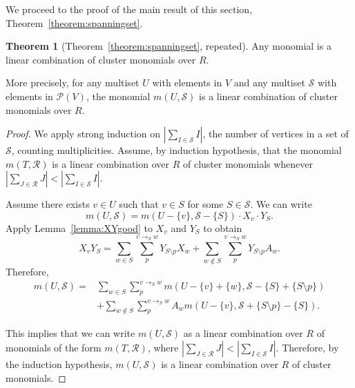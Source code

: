 \documentclass[11pt]{article}
\theoremstyle{definition}
\newtheorem*{theo*}{Theorem}
\numberwithin{equation}{section}
\newcommand{\vertices}{V}
\newcommand{\powerset}[1]{\mathcal{P}(#1)}
\newcommand{\coefficientring}{R}
\newcommand{\monomial}[2]{m(#1, #2)}
\newcommand{\ppath}[3]{\ensuremath{#1 \to_{#2} #3}}
\begin{document}
We proceed to the proof of the main result of this section, Theorem~\ref{theorem:spanningset}.

\begin{theo*}[Theorem~\ref{theorem:spanningset}, repeated] \label{theorem:spanningset:repeated}
    Any monomial is a linear combination of cluster monomials over \(\coefficientring\).

    More precisely, for any multiset \(U\) with elements in \(\vertices\) and any multiset \(\mathcal{S}\) with elements in \(\powerset{\vertices}\), the monomial \(\monomial{U}{\mathcal{S}}\) is a linear combination of cluster monomials over \(\coefficientring\).
\end{theo*}

\begin{proof}
    We apply strong induction on \(\left|\sum_{I \in \mathcal{S}} I\right|\), the number of vertices in a set of \(\mathcal{S}\), counting multiplicities.
    Assume, by induction hypothesis, that the monomial \(\monomial{T}{\mathcal{R}}\) is a linear combination over \(\coefficientring\) of cluster monomials whenever \(\left|\sum_{J \in \mathcal{R}} J\right| < \left|\sum_{I \in \mathcal{S}} I\right|\).

    Assume there exists \(v \in U\) such that \(v \in S\) for some \(S \in \mathcal{S}\).
    We can write
    \begin{equation*}
        \monomial{U}{\mathcal{S}} = \monomial{U - \{v\}}{\mathcal{S} - \{S\}} \cdot X_v \cdot Y_S.
    \end{equation*}
    Apply Lemma~\ref{lemma:XYgood} to \(X_v\) and \(Y_S\) to obtain
    \begin{equation*}
        X_v Y_S =
        \sum_{w \in S}
        \sum_{p}^{\ppath{v}{S}{w}}
        Y_{S \setminus p}  X_w
        +
        \sum_{w \not\in S}
        \sum_{p}^{\ppath{v}{S}{w}}
        Y_{S \setminus p}  A_w.
    \end{equation*}
    Therefore,
    \begin{align*}
        \monomial{U}{\mathcal{S}}
        = & \sum_{w \in S}
        \sum_{p}^{\ppath{v}{S}{w}}
        \monomial{U - \{v\} + \{w\}}{\mathcal{S} - \{S\} + \{S \setminus p\}} \\
        & + 
        \sum_{w \not\in S}
        \sum_{p}^{\ppath{v}{S}{w}}
        A_w \monomial{U - \{v\}}{\mathcal{S} + \{S \setminus p\} - \{S\}}.
    \end{align*}

    This implies that we can write \(\monomial{U}{\mathcal{S}}\) as a linear combination over \(\coefficientring\) of monomials of the form \(\monomial{T}{\mathcal{R}}\),
    where \(\left|\sum_{J \in \mathcal{R}} J\right| < \left|\sum_{I \in \mathcal{S}} I\right|\).
    Therefore, by the induction hypothesis, \(\monomial{U}{\mathcal{S}}\) is a linear combination over \(\coefficientring\) of cluster monomials.


\end{proof}
\end{document}
